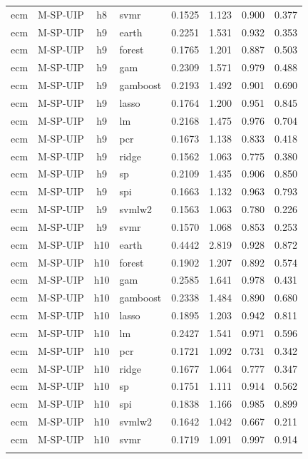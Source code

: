 \begin{ThreePartTable}
\begin{longtable}[t]{llclcccc}
ecm & M-SP-UIP & h8 & svmr & 0.1525 & 1.123 & 0.900 & 0.377\\
\addlinespace
ecm & M-SP-UIP & h9 & earth & 0.2251 & 1.531 & 0.932 & 0.353\\
ecm & M-SP-UIP & h9 & forest & 0.1765 & 1.201 & 0.887 & 0.503\\
ecm & M-SP-UIP & h9 & gam & 0.2309 & 1.571 & 0.979 & 0.488\\
ecm & M-SP-UIP & h9 & gamboost & 0.2193 & 1.492 & 0.901 & 0.690\\
ecm & M-SP-UIP & h9 & lasso & 0.1764 & 1.200 & 0.951 & 0.845\\
ecm & M-SP-UIP & h9 & lm & 0.2168 & 1.475 & 0.976 & 0.704\\
ecm & M-SP-UIP & h9 & pcr & 0.1673 & 1.138 & 0.833 & 0.418\\
ecm & M-SP-UIP & h9 & ridge & 0.1562 & 1.063 & 0.775 & 0.380\\
ecm & M-SP-UIP & h9 & sp & 0.2109 & 1.435 & 0.906 & 0.850\\
ecm & M-SP-UIP & h9 & spi & 0.1663 & 1.132 & 0.963 & 0.793\\
ecm & M-SP-UIP & h9 & svmlw2 & 0.1563 & 1.063 & 0.780 & 0.226\\
ecm & M-SP-UIP & h9 & svmr & 0.1570 & 1.068 & 0.853 & 0.253\\
\addlinespace
ecm & M-SP-UIP & h10 & earth & 0.4442 & 2.819 & 0.928 & 0.872\\
ecm & M-SP-UIP & h10 & forest & 0.1902 & 1.207 & 0.892 & 0.574\\
ecm & M-SP-UIP & h10 & gam & 0.2585 & 1.641 & 0.978 & 0.431\\
ecm & M-SP-UIP & h10 & gamboost & 0.2338 & 1.484 & 0.890 & 0.680\\
ecm & M-SP-UIP & h10 & lasso & 0.1895 & 1.203 & 0.942 & 0.811\\
ecm & M-SP-UIP & h10 & lm & 0.2427 & 1.541 & 0.971 & 0.596\\
ecm & M-SP-UIP & h10 & pcr & 0.1721 & 1.092 & 0.731 & 0.342\\
ecm & M-SP-UIP & h10 & ridge & 0.1677 & 1.064 & 0.777 & 0.347\\
ecm & M-SP-UIP & h10 & sp & 0.1751 & 1.111 & 0.914 & 0.562\\
ecm & M-SP-UIP & h10 & spi & 0.1838 & 1.166 & 0.985 & 0.899\\
ecm & M-SP-UIP & h10 & svmlw2 & 0.1642 & 1.042 & 0.667 & 0.211\\
ecm & M-SP-UIP & h10 & svmr & 0.1719 & 1.091 & 0.997 & 0.914\\
\addlinespace

\end{longtable}
\end{ThreePartTable}
